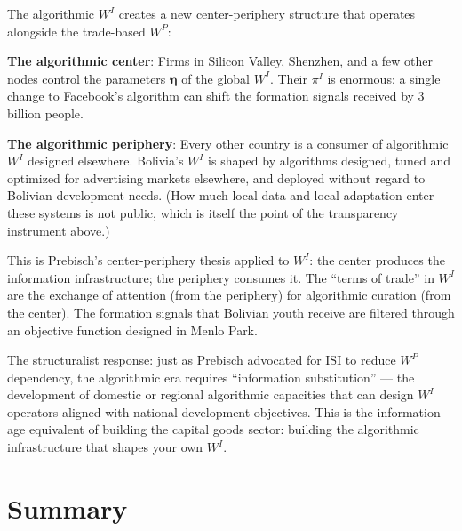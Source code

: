 \documentclass[../structural_economics_book.tex]{subfiles}
\begin{document}
\begin{prebisch}
The algorithmic $W^I$ creates a new center-periphery structure that operates alongside the trade-based $W^P$:

\textbf{The algorithmic center}: Firms in Silicon Valley, Shenzhen, and a few other nodes control the parameters $\boldsymbol{\eta}$ of the global $W^I$. Their $\pi^I$ is enormous: a single change to Facebook's algorithm can shift the formation signals received by 3 billion people.

\textbf{The algorithmic periphery}: Every other country is a consumer of algorithmic $W^I$ designed elsewhere. Bolivia's $W^I$ is shaped by algorithms designed, tuned and optimized for advertising markets elsewhere, and deployed without regard to Bolivian development needs. (How much local data and local adaptation enter these systems is not public, which is itself the point of the transparency instrument above.)

This is Prebisch's center-periphery thesis applied to $W^I$: the center produces the information infrastructure; the periphery consumes it. The ``terms of trade'' in $W^I$ are the exchange of attention (from the periphery) for algorithmic curation (from the center). The formation signals that Bolivian youth receive are filtered through an objective function designed in Menlo Park.

The structuralist response: just as Prebisch advocated for ISI to reduce $W^P$ dependency, the algorithmic era requires ``information substitution'' --- the development of domestic or regional algorithmic capacities that can design $W^I$ operators aligned with national development objectives. This is the information-age equivalent of building the capital goods sector: building the algorithmic infrastructure that shapes your own $W^I$.
\end{prebisch}


\section{Summary}
\label{ch27:sec:summary}
\end{document}
